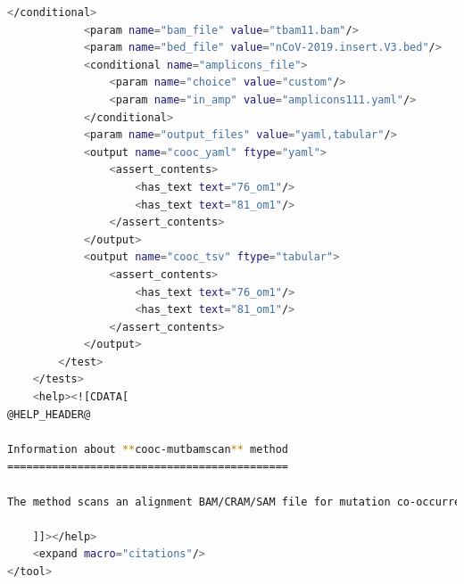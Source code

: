 \begin{lstlisting}[language=bash, caption=tool wrapper for Cojac: mutbamscan, label=list:methods:wrapper-cojac-mutbamcsan]
            </conditional>
            <param name="bam_file" value="tbam11.bam"/>
            <param name="bed_file" value="nCoV-2019.insert.V3.bed"/>
            <conditional name="amplicons_file">
                <param name="choice" value="custom"/>
                <param name="in_amp" value="amplicons111.yaml"/>
            </conditional>
            <param name="output_files" value="yaml,tabular"/>
            <output name="cooc_yaml" ftype="yaml">
                <assert_contents>
                    <has_text text="76_om1"/>
                    <has_text text="81_om1"/>
                </assert_contents>
            </output>
            <output name="cooc_tsv" ftype="tabular">
                <assert_contents>
                    <has_text text="76_om1"/>
                    <has_text text="81_om1"/>
                </assert_contents>
            </output>
        </test>
    </tests>
    <help><![CDATA[
@HELP_HEADER@

Information about **cooc-mutbamscan** method
============================================

The method scans an alignment BAM/CRAM/SAM file for mutation co-occurrences and output a JSON or YAML file.

    ]]></help>
    <expand macro="citations"/>
</tool>
\end{lstlisting}
